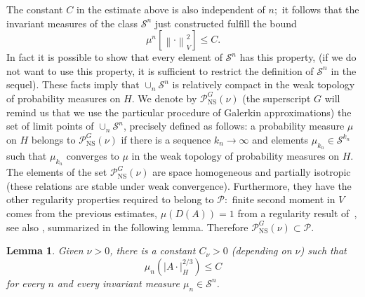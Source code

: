 \documentclass[11pt]{preprint}
\newtheorem{lemma}[theorem]{Lemma}
\begin{document}
The constant $C$ in the estimate above is also independent of $n$;\ it follows
that the invariant measures of the class $\mathcal{S}^{n}$ just constructed
fulfill the bound
\[
\mu^{n}\left[  \left\|  \cdot\right\|  _{V}^{2}\right]  \leq C.
\]
In fact it is possible to show that every element of $\mathcal{S}^{n}$ has
this property, \cite{FlaCetraro} (if we do not want to use this property, it
is sufficient to restrict the definition of $\mathcal{S}^{n}$ in the sequel).
These facts imply that $\cup_{n}\mathcal{S}^{n}$ is relatively compact in the
weak topology of probability measures on $H$. We denote by $\mathcal{P}%
_{{\mathrm{NS}}}^{G}\left(  \nu\right)  $ (the superscript $G$ will remind us
that we use the particular procedure of Galerkin approximations) the set of
limit points of $\cup_{n}\mathcal{S}^{n}$, precisely defined as follows: a
probability measure $\mu$ on $H$ belongs to $\mathcal{P}_{{\mathrm{NS}}}%
^{G}\left(  \nu\right)  $ if there is a sequence $k_{n}\rightarrow\infty$ and
elements $\mu_{k_{n}}\in\mathcal{S}^{k_{n}}$ such that $\mu_{k_{n}}$ converges
to $\mu$ in the weak topology of probability measures on $H$. The elements of
the set $\mathcal{P}_{{\mathrm{NS}}}^{G}\left(  \nu\right)  $ are space
homogeneous and partially isotropic (these relations are stable under weak
convergence). Furthermore, they have the other regularity properties required
to belong to $\mathcal{P}$:\ finite second moment in $V$ comes from the
previous estimates, $\mu\left(  D(A)\right)  =1$ from a regularity result
of~\cite{DaPDeb}, see also \cite{FlaCetraro}, summarized in the following
lemma. Therefore $\mathcal{P}_{{\mathrm{NS}}}^{G}\left(  \nu\right)
\subset\mathcal{P}$.

\begin{lemma}
Given $\nu>0$, there is a constant $C_{\nu}>0$ (depending on $\nu$) such that
\[
\mu_{n}\left(  \left|  A\cdot\right|  _{H}^{2/3}\right)  \leq C
\]
for every $n$ and every invariant measure $\mu_{n}\in\mathcal{S}^{n}$.
\end{lemma}
\end{document}

